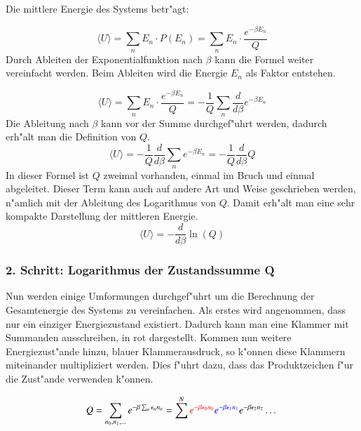 \begin{refsection}
Die mittlere Energie des Systems betr"agt:

\begin{equation}
    \langle U \rangle = \sum_{n} E_n \cdot P(E_n) = \sum_{n} E_n \cdot \frac{e^{-\beta E_n}}{Q}
\end{equation}
Durch Ableiten der Exponentialfunktion nach $\beta$ kann die Formel weiter vereinfacht werden. Beim Ableiten wird die Energie $E_n$ als Faktor entstehen.

\begin{equation*}
\langle U \rangle = \sum_{n} E_n \cdot \frac{e^{-\beta E_n}}{Q} = -\frac{1}{Q} \sum_{n} \frac{d}{d \beta} e^{-\beta E_n} 
\end{equation*}
Die Ableitung nach $\beta$ kann vor der Summe durchgef"uhrt werden, dadurch erh"alt man die Definition von $Q$.
\begin{equation*}
\langle U \rangle = -\frac{1}{Q} \frac{d}{d \beta} \sum_{n}  e^{-\beta E_n}  = -\frac{1}{Q} \frac{d}{d \beta}Q
\end{equation*}
In dieser Formel ist $Q$ zweimal vorhanden, einmal im Bruch und einmal abgeleitet. Dieser Term kann auch auf andere Art und Weise geschrieben werden, n"amlich mit der Ableitung des Logarithmus von $Q$. Damit erh"alt man eine sehr kompakte Darstellung der mittleren Energie.
\begin{equation}
\langle U \rangle = -\frac{d}{d \beta} \ln(Q)
\end{equation}

\subsubsection{2. Schritt: Logarithmus der Zustandssumme Q}

Nun werden einige Umformungen durchgef"uhrt um die Berechnung der Gesamtenergie des Systems zu vereinfachen.
Als erstes wird angenommen, dass nur ein einziger Energiezustand existiert.
Dadurch kann man eine Klammer mit Summanden ausschreiben, in rot dargestellt.
Kommen nun weitere Energiezust"ande hinzu, blauer Klammerausdruck, so k"onnen diese Klammern miteinander multipliziert werden.
Dies f"uhrt dazu, dass das Produktzeichen f"ur die Zust"ande verwenden k"onnen.


\begin{equation}
Q = \sum\limits_{n_0, n_1, \dots} e^{- \beta \sum_a \epsilon_a n_a } 
=  \sum^N  \textcolor{red}{ e^{- \beta \epsilon_0 n_0 }} \textcolor{blue} {e^{- \beta \epsilon_1 n_1 }} e^{- \beta \epsilon_2 n_2 } \dots 
\end{equation}


\end{refsection}

